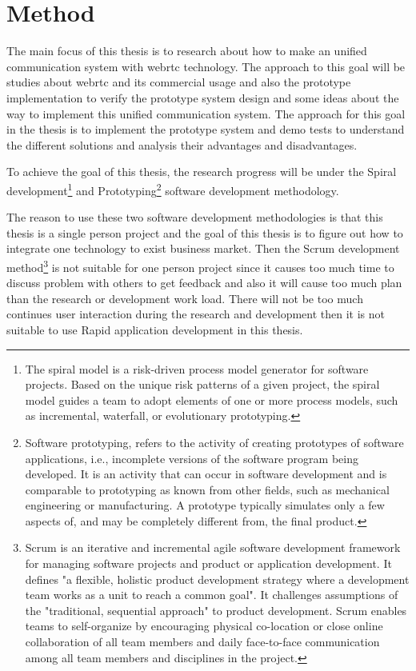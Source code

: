 \section{Method}

\noindent The main focus of this thesis is to research about how to make an unified communication system with \gls{webrtc} technology. The approach to this goal will be studies about \gls{webrtc} and its commercial usage and also the prototype implementation to verify the prototype system design and some ideas about the way to implement this unified communication system. The approach for this goal in the thesis is to implement the prototype system and demo tests to understand the different solutions and analysis their advantages and disadvantages.

\par To achieve the goal of this thesis, the research progress will be under the Spiral development\footnote{The spiral model is a risk-driven process model generator for software projects. Based on the unique risk patterns of a given project, the spiral model guides a team to adopt elements of one or more process models, such as incremental, waterfall, or evolutionary prototyping.\cite{wiki:spiral}} and Prototyping\footnote{Software prototyping, refers to the activity of creating prototypes of software applications, i.e., incomplete versions of the software program being developed. It is an activity that can occur in software development and is comparable to prototyping as known from other fields, such as mechanical engineering or manufacturing.
A prototype typically simulates only a few aspects of, and may be completely different from, the final product.\cite{wiki:prototyping}} software development methodology. 

\par The reason to use these two software development methodologies is that this thesis is a single person project and the goal of this thesis is to figure out how to integrate one technology to exist business market. Then the Scrum development method\footnote{Scrum is an iterative and incremental agile software development framework for managing software projects and product or application development. It defines "a flexible, holistic product development strategy where a development team works as a unit to reach a common goal". It challenges assumptions of the "traditional, sequential approach" to product development. Scrum enables teams to self-organize by encouraging physical co-location or close online collaboration of all team members and daily face-to-face communication among all team members and disciplines in the project.\cite{wiki:scrum}} is not suitable for one person project since it causes too much time to discuss problem with others to get feedback and also it will cause too much plan than the research or development work load. There will not be too much continues user interaction during the research and development then it is not suitable to use Rapid application development in this thesis.

